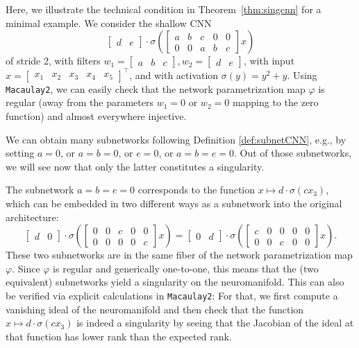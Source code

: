 \documentclass{article} %
\theoremstyle{plain}%
\theoremstyle{definition}
\theoremstyle{remark}
\begin{document}
Here, we illustrate the technical condition in Theorem~\ref{thm:singcnn} for a minimal example. We consider the shallow CNN
\begin{equation}
    \begin{bmatrix}
        d & e
    \end{bmatrix}
    \cdot \sigma \left( \begin{bmatrix}
        a & b & c & 0 & 0 \\
        0 & 0 & a & b & c
    \end{bmatrix} x \right)
\end{equation}
of stride 2, with filters $w_1 = \begin{bmatrix}
    a & b & c
\end{bmatrix}, w _2 = \begin{bmatrix}
    d & e
\end{bmatrix}$,
with input $x = \begin{bmatrix}
    x_1 & x_2 & x_3 & x_4 & x_5
\end{bmatrix}^\top$, and with activation $\sigma(y) = y^2+y $.
Using \texttt{Macaulay2}, we can easily check that the network parametrization map $\varphi$ is regular (away from the parameters $w_1=0$ or $w_2=0$ mapping to the zero function) and almost everywhere injective. 

We can obtain many subnetworks following Definition \ref{def:subnetCNN}, e.g., by setting $a=0$, or $a=b=0$, or $e=0$, or $a=b=e=0$.
Out of those subnetworks, we will see now that only the latter constitutes a singularity. 

The subnetwork $a=b=e=0$ corresponds to the function $x \mapsto d \cdot \sigma (c x_3)$, which can be embedded in two different ways as a subnetwork into the original architecture:
\begin{equation}
    \begin{bmatrix}
        d & 0
    \end{bmatrix}
    \cdot \sigma \left( \begin{bmatrix}
        0 & 0 & c & 0 & 0 \\
        0 & 0 & 0 & 0 & c
    \end{bmatrix} x \right)
 = 
    \begin{bmatrix}
        0 & d
    \end{bmatrix}
    \cdot \sigma \left( \begin{bmatrix}
        c & 0 & 0 & 0 & 0 \\
        0 & 0 & c & 0 & 0
    \end{bmatrix} x \right).
\end{equation}
These two subnetworks are in the same fiber of the network parametrization map $\varphi$.
Since $\varphi$ is regular and generically one-to-one, this means that the (two equivalent) subnetworks yield a singularity on the neuromanifold. 
This can also be verified via explicit calculations in \texttt{Macaulay2}: For that, we first compute a vanishing ideal of the neuromanifold and then check that the function $x \mapsto d \cdot \sigma (c x_3)$ is indeed a singularity by seeing that the Jacobian of the ideal at that function has lower rank than the expected rank.
\end{document}
